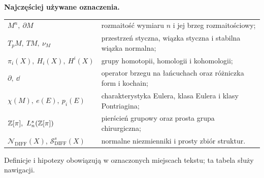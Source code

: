 \noindent\textbf{Najczęściej używane oznaczenia.}
\begin{center}
\begin{tabular}{p{3.9cm}p{9.7cm}}
$M^n,\ \partial M$ & rozmaitość wymiaru $n$ i jej brzeg rozmaitościowy;\\
$T_pM,\ TM,\ \nu_M$ & przestrzeń styczna, wiązka styczna i stabilna wiązka normalna;\\
$\pi_i(X),\ H_i(X),\ H^i(X)$ & grupy homotopii, homologii i kohomologii;\\
$\partial,\ \dd$ & operator brzegu na łańcuchach oraz różniczka form i kochain;\\
$\chi(M),\ e(E),\ p_i(E)$ & charakterystyka Eulera, klasa Eulera i klasy Pontriagina;\\
$\Z[\pi],\ L_n^s(\Z[\pi])$ & pierścień grupowy oraz prosta grupa chirurgiczna;\\
$\mathcal N_{\mathrm{DIFF}}(X)$,\newline
$\mathcal S^s_{\mathrm{DIFF}}(X)$ & normalne niezmienniki i prosty zbiór struktur.
\end{tabular}
\end{center}
Definicje i hipotezy obowiązują w oznaczonych
miejscach tekstu; ta tabela służy nawigacji.

\clearpage

